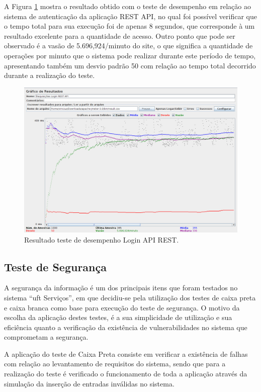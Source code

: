 A Figura \ref{login_rest} mostra o resultado obtido com o teste de desempenho em relação ao sistema de autenticação da aplicação REST API, no qual foi possível verificar que o tempo total para sua execução foi de apenas 8 segundos, que corresponde à um resultado excelente para a quantidade de acesso. Outro ponto que pode ser observado é a vasão de 5.696,924/minuto do site, o que significa a quantidade de operações por minuto que o sistema pode realizar durante este período de tempo, apresentando também um desvio padrão 50 com relação ao tempo total decorrido durante a realização do teste.

\begin{figure}[!h]
  \centering
  \small
  \includegraphics[width=1\textwidth]{figuras/login_rest.png} 
  \caption{Resultado teste de desempenho Login API REST.}
  \label{login_rest} 
\end{figure}


\subsection*{Teste de Segurança}

A segurança da informação é um dos principais itens que foram testados no sistema ``\acrshort{uft} Serviços'', em que decidiu-se pela utilização dos testes de caixa preta e caixa branca como base para execução do teste de segurança. O motivo da escolha da aplicação destes testes,  é a sua simplicidade de utilização e sua eficiência quanto a verificação da existência de vulnerabilidades no sistema que comprometam a segurança.

A aplicação do teste de Caixa Preta consiste em verificar a existência de falhas com relação ao levantamento de requisitos do sistema, sendo que para a realização do teste é verificado o funcionamento de toda a aplicação através da simulação da inserção de entradas inválidas no sistema.

